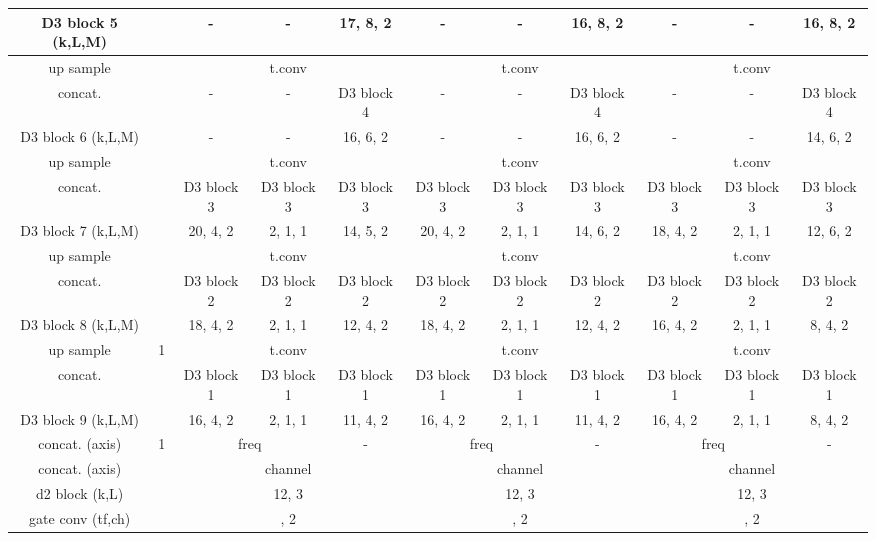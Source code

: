 \documentclass{article}
\begin{document}
\begin{table*}[t]
{\begin{tabular}{ c | c | c | c | c | c | c | c | c | c | c}
        \cline{3-11}
        D3 block 5 (k,L,M) & & - & - & 17, 8, 2 &  - & - & 16, 8, 2 & - & - & 16, 8, 2 \\
        \hline
        up sample  & \multirow{3}{*}{} & \multicolumn{3}{c|}{t.conv } &  \multicolumn{3}{c|}{t.conv } & \multicolumn{3}{c}{t.conv } \\
        \cline{3-11}
        concat. & & - & - & D3 block 4 & - & - & D3 block 4 & - & - & D3 block 4 \\
        D3 block 6 (k,L,M) & & -& - & 16, 6, 2& -& - & 16, 6, 2& -& - & 14, 6, 2 \\
		\hline
        up sample  & \multirow{3}{*}{} & \multicolumn{3}{c|}{t.conv } &  \multicolumn{3}{c|}{t.conv } & \multicolumn{3}{c}{t.conv } \\
        \cline{3-11}
        concat. & & D3 block 3 & D3 block 3 & D3 block 3 & D3 block 3 & D3 block 3 & D3 block 3 & D3 block 3 & D3 block 3 & D3 block 3\\
        D3 block 7 (k,L,M) & & 20, 4, 2& 2, 1, 1 & 14, 5, 2 & 20, 4, 2& 2, 1, 1 & 14, 6, 2 & 18, 4, 2& 2, 1, 1 & 12, 6, 2\\
		\hline
        up sample  & \multirow{3}{*}{} & \multicolumn{3}{c|}{t.conv } & \multicolumn{3}{c|}{t.conv }  & \multicolumn{3}{c}{t.conv }\\
        \cline{3-11}
        concat. & & D3 block 2 & D3 block 2 & D3 block 2 & D3 block 2 & D3 block 2 & D3 block 2 & D3 block 2 & D3 block 2 & D3 block 2 \\
        D3 block 8 (k,L,M) & & 18, 4, 2 & 2, 1, 1 & 12, 4, 2  & 18, 4, 2 & 2, 1, 1 & 12, 4, 2 & 16, 4, 2 & 2, 1, 1 & 8, 4, 2\\
		\hline
        up sample  & \multirow{3}{*}{1} & \multicolumn{3}{c|}{t.conv } &  \multicolumn{3}{c|}{t.conv }  & \multicolumn{3}{c}{t.conv } \\
        \cline{3-11}
        concat. & & D3 block 1 & D3 block 1 & D3 block 1 & D3 block 1 & D3 block 1 & D3 block 1 & D3 block 1 & D3 block 1 & D3 block 1\\
        D3 block 9 (k,L,M) & & 16, 4, 2 & 2, 1, 1 & 11, 4, 2  & 16, 4, 2 & 2, 1, 1 & 11, 4, 2 & 16, 4, 2 & 2, 1, 1 & 8, 4, 2\\        
        \hline
        concat. (axis) & \multirow{4}{*}{1} & \multicolumn{2}{c|}{freq} & - & \multicolumn{2}{c|}{freq} & - & \multicolumn{2}{c|}{freq} & - \\
        \cline{3-11}
        concat. (axis) &  & \multicolumn{3}{c|}{channel} &  \multicolumn{3}{c|}{channel} & \multicolumn{3}{c}{channel}\\
        \cline{3-11}
        d2 block (k,L) & & \multicolumn{3}{c|}{12, 3} & \multicolumn{3}{c|}{12, 3} & \multicolumn{3}{c}{12, 3} \\   
        \cline{3-11}
        gate conv (tf,ch) &   & \multicolumn{3}{c|}{, 2} &  \multicolumn{3}{c|}{, 2}&  \multicolumn{3}{c}{, 2}\\
        \hline
      \end{tabular}
    }
\end{table*}
\end{document}
